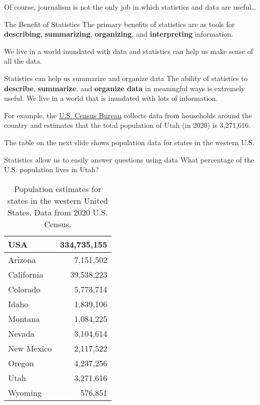 \documentclass[
  ignorenonframetext,
]{beamer}
\begin{document}
\begin{frame}{}
\protect\hypertarget{section-5}{}
Of course, journalism is not the only job in which statistics and data
are useful\ldots{}
\end{frame}

\begin{frame}{The Benefit of Statistics}
\protect\hypertarget{the-benefit-of-statistics}{}
The primary benefits of statistics are as tools for \textbf{describing},
\textbf{summarizing}, \textbf{organizing}, and \textbf{interpreting}
information.

We live in a world inundated with data and statistics can help us make
sense of all the data.
\end{frame}

\begin{frame}{Statistics can help us summarize and organize data}
\protect\hypertarget{statistics-can-help-us-summarize-and-organize-data}{}
The ability of statistics to \textbf{describe}, \textbf{summarize}, and
\textbf{organize data} in meaningful ways is extremely useful. We live
in a world that is inundated with lots of information.

For example, the \href{https://data.census.gov/}{U.S. Census Bureau}
collects data from households around the country and estimates that the
total population of Utah (in 2020) is 3,271,616.

The table on the next slide shows population data for states in the
western U.S.
\end{frame}

\begin{frame}{Statistics allow us to easily answer questions using data
\textbar{} What percentage of the U.S. population lives in Utah?}
\protect\hypertarget{statistics-allow-us-to-easily-answer-questions-using-data-what-percentage-of-the-u.s.-population-lives-in-utah}{}
\begin{table}

\caption{\label{tab:unnamed-chunk-1}Population estimates for states in the western United States. Data from 2020 U.S. Census.}
\centering
\fontsize{25}{27}\selectfont
\begin{tabular}[t]{l|r}
\hline
USA & 334,735,155\\
\hline
Arizona & 7,151,502\\
\hline
California & 39,538,223\\
\hline
Colorado & 5,773,714\\
\hline
Idaho & 1,839,106\\
\hline
Montana & 1,084,225\\
\hline
Nevada & 3,104,614\\
\hline
New Mexico & 2,117,522\\
\hline
Oregon & 4,237,256\\
\hline
Utah & 3,271,616\\
\hline
Wyoming & 576,851\\
\hline
\end{tabular}
\end{table}
\end{frame}
\end{document}
